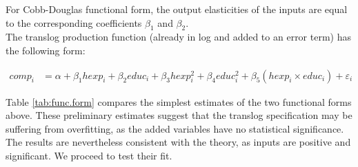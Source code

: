 \documentclass[12pt,a4paper]{article}\usepackage[]{graphicx}\usepackage[]{color}
\begin{document}
For Cobb-Douglas functional form, the output elasticities of the inputs are equal to the corresponding coefficients $\beta_1$ and $\beta_2$. \\

The translog production function (already in log and added to an error term) has the following form: 

\begin{equation}
\label{eq:translog.nocontrols}
\begin{aligned}
comp_i &= \alpha + \beta_1 hexp_i + \beta_2 educ_i + \beta_3 hexp_i^2 + \beta_4 educ_i^2 + \beta_5 \left(hexp_i \times educ_i\right) + \varepsilon_i
\end{aligned}
\end{equation}


Table \ref{tab:func.form} compares the simplest estimates of the two functional forms above. These preliminary estimates suggest that the translog specification may be suffering from overfitting, as the added variables have no statistical significance. The results are nevertheless consistent with the theory, as inputs are positive and significant. We proceed to test their fit.
\end{document}
